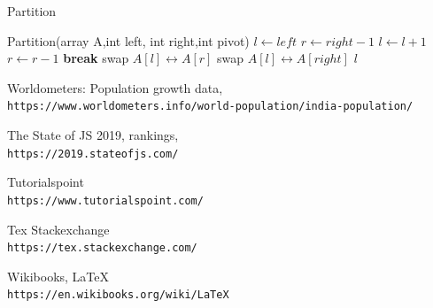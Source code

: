 \documentclass{article}
\begin{document}
 
\begin{algorithm}[!h]
\Large
\caption{\Large Partition}
\begin{algorithmic}
\STATE Partition(array A,int left, int right,int pivot)
\STATE $l \leftarrow left$
\STATE $r \leftarrow right-1$
\STATE $l\leftarrow l+1$
\ENDWHILE
{}
\STATE $r\leftarrow r-1$
\ENDWHILE
{}
\STATE \textbf{break}
\ELSE
\STATE swap $A[l] \leftrightarrow A[r]$
\ENDIF
\ENDWHILE
\STATE swap $A[l] \leftrightarrow A[right]$
\RETURN $l$
\end{algorithmic}
\end{algorithm}
\newpage
\begin{thebibliography}{9}
Worldometers: Population growth data,
\\\texttt{https://www.worldometers.info/world-population/india-population/}

The State of JS 2019, rankings,
\\\texttt{https://2019.stateofjs.com/}

Tutorialspoint
\\\texttt{https://www.tutorialspoint.com/}

Tex Stackexchange
\\\texttt{https://tex.stackexchange.com/}

Wikibooks, \LaTeX
\\\texttt{https://en.wikibooks.org/wiki/LaTeX}
\end{thebibliography}
\end{document}
